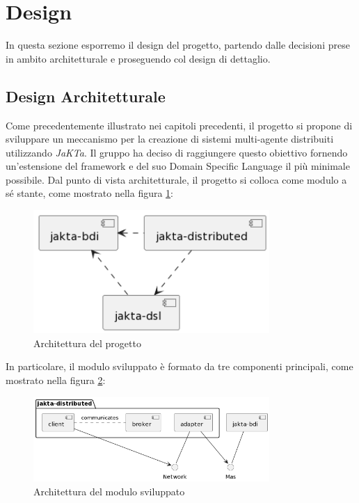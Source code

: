 \section{Design}
In questa sezione esporremo il design del progetto, partendo dalle decisioni prese in ambito architetturale e proseguendo
col design di dettaglio.

\subsection{Design Architetturale}
Come precedentemente illustrato nei capitoli precedenti, il progetto si propone di sviluppare un meccanismo per la creazione di sistemi multi-agente distribuiti utilizzando \textit{JaKTa}.
Il gruppo ha deciso di raggiungere questo obiettivo fornendo un'estensione del framework e del suo Domain Specific Language il più minimale possibile.
Dal punto di vista architetturale, il progetto si colloca come modulo a sé stante, come mostrato nella figura \ref{fig:architecture}:

\begin{figure}[ht!]
    \centering
    \includegraphics[width=0.8\textwidth]{figures/general-architecture.png}
    \caption{Architettura del progetto}
    \label{fig:architecture}
\end{figure}

In particolare, il modulo sviluppato è formato da tre componenti principali, come mostrato nella figura \ref{fig:detailed-architecture}:

\begin{figure}[ht!]
    \centering
    \includegraphics[width=0.8\textwidth]{figures/detailed-architecture.png}
    \caption{Architettura del modulo sviluppato}
    \label{fig:detailed-architecture}
\end{figure}

